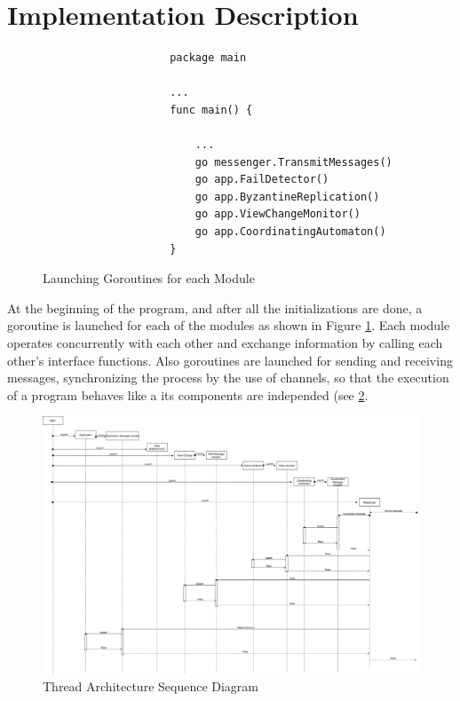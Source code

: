 \documentclass[12pt,a4paper]{report}
\begin{document}
		\section{Implementation Description}
		       \begin{figure}
		        \centering
		         \begin{lstlisting} 
                    package main
        
                    ...
                    func main() {
            
                        ...
                        go messenger.TransmitMessages()
                    	go app.FailDetector()
            	        go app.ByzantineReplication()
        	            go app.ViewChangeMonitor()
        	            go app.CoordinatingAutomaton()
                    }
                 \end{lstlisting}
		        \caption{Launching Goroutines for each Module}
		        \label{fig:main_go}
		    \end{figure}
		    At the beginning of the program, and after all the initializations are done, a goroutine is launched for each of the modules as shown in Figure \ref{fig:main_go}. Each module operates concurrently with each other and exchange information by calling each other's interface functions. Also goroutines are launched for sending and receiving messages, synchronizing the process by the use of channels, so that the execution of a program behaves like a its components are independed (see \ref{fig:thread_arch}.
		    
		    \begin{figure}
		        \centering
		        \includegraphics[scale = 0.25]{ade/thread_architecture.png}
		        \caption{Thread Architecture Sequence Diagram}
		        \label{fig:thread_arch}
		    \end{figure}
	     
\end{document}
